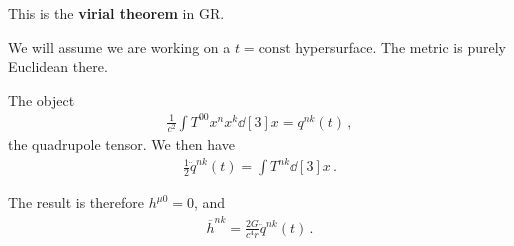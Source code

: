 \documentclass[main.tex]{subfiles}
\begin{document}
This is the \textbf{virial theorem} in GR. 

We will assume we are working on a \(t = \text{const}\) hypersurface. 
The metric is purely Euclidean there. 

The object 
%
\begin{align}
\frac{1}{c^2} \int T^{00} x^{n} x^{k} \dd[3]{x} = q^{n k} (t) 
\,,
\end{align}
%
the quadrupole tensor. 
We then have 
%
\begin{align}
\frac{1}{2} \ddot{q}^{n k} (t) = \int T^{nk} \dd[3]{x}
\,.
\end{align}

The result is therefore \(h^{\mu 0} = 0\), and 
%
\begin{align}
\overline{h}^{n k} = \frac{2G}{c^{4} r} \ddot{q}^{n k}(t)
\,.
\end{align}
\end{document}
